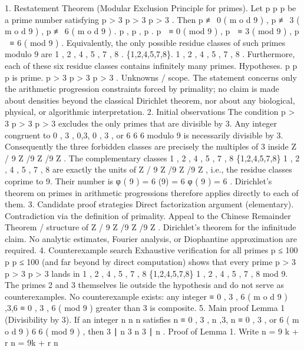 1. Restatement
Theorem (Modular Exclusion Principle for primes).
Let
p
p
p
be a prime number satisfying
p
>
3
p > 3
p
>
3
. Then
p
≢
0
(
m
o
d
9
)
,
p
≢
3
(
m
o
d
9
)
,
p
≢
6
(
m
o
d
9
)
.
p \not{} ,\qquad
p \not{} ,\qquad
p \not{} .
p

≡
0
(
mod
9
)
,
p

≡
3
(
mod
9
)
,
p

≡
6
(
mod
9
)
.
Equivalently, the only possible residue classes of such primes modulo 9 are
{
1
,
2
,
4
,
5
,
7
,
8
}
.
\{1,2,4,5,7,8\}.
{
1
,
2
,
4
,
5
,
7
,
8
}
.
Furthermore, each of these six residue classes contains infinitely many primes.
Hypotheses.
p
p
p
is prime.
p
>
3
p > 3
p
>
3
.
Unknowns / scope.
The statement concerns only the arithmetic progression constraints forced by primality; no claim is made about densities beyond the classical Dirichlet theorem, nor about any biological, physical, or algorithmic interpretation.
2. Initial observations
The condition
p
>
3
p > 3
p
>
3
excludes the only primes that are divisible by 3.
Any integer congruent to
0
,
3
,
0,3,
0
,
3
,
or
6
6
6
modulo 9 is necessarily divisible by 3.
Consequently the three forbidden classes are precisely the multiples of 3 inside
Z
/
9
Z
/9
Z
/9
Z
.
The complementary classes
{
1
,
2
,
4
,
5
,
7
,
8
}
\{1,2,4,5,7,8\}
{
1
,
2
,
4
,
5
,
7
,
8
}
are exactly the units of
Z
/
9
Z
/9
Z
/9
Z
, i.e., the residue classes coprime to 9. Their number is
φ
(
9
)
=
6
\varphi(9) = 6
φ
(
9
)
=
6
.
Dirichlet’s theorem on primes in arithmetic progressions therefore applies directly to each of them.
3. Candidate proof strategies
Direct factorization argument (elementary).
Contradiction via the definition of primality.
Appeal to the Chinese Remainder Theorem / structure of
Z
/
9
Z
/9
Z
/9
Z
.
Dirichlet’s theorem for the infinitude claim.
No analytic estimates, Fourier analysis, or Diophantine approximation are required.
4. Counterexample search
Exhaustive verification for all primes
p
≤
100
p 
p
≤
100
(and far beyond by direct computation) shows that every prime
p
>
3
p > 3
p
>
3
lands in
{
1
,
2
,
4
,
5
,
7
,
8
}
\{1,2,4,5,7,8\}
{
1
,
2
,
4
,
5
,
7
,
8
}
mod 9.
The primes 2 and 3 themselves lie outside the hypothesis and do not serve as counterexamples.
No counterexample exists: any integer
≡
0
,
3
,
6
(
m
o
d
9
)
,3,6 
≡
0
,
3
,
6
(
mod
9
)
greater than 3 is composite.
5. Main proof
Lemma 1 (Divisibility by 3).
If an integer
n
n
n
satisfies
n
≡
0
,
3
,
n ,3,
n
≡
0
,
3
,
or
6
(
m
o
d
9
)
6 
6
(
mod
9
)
, then
3
∣
n
3 \mid n
3
∣
n
.
Proof of Lemma 1.
Write
n
=
9
k
+
r
n = 9k + r
n
